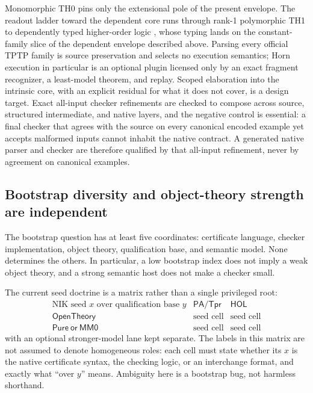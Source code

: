 \documentclass[11pt]{article}
\theoremstyle{definition}
\theoremstyle{remark}
\begin{document}
Monomorphic TH0 pins only the extensional pole of the present envelope.  The
readout ladder toward the dependent core runs through rank-1 polymorphic TH1
\cite{KaliszykSutcliffeRabeTH1} to dependently typed higher-order logic
\cite{RothgangRabeBenzmullerDHOL}, whose typing lands on the constant-family
slice of the dependent envelope described above.  Parsing every official
TPTP family is source preservation and selects no execution semantics; Horn
execution in particular is an optional plugin licensed only by an exact
fragment recognizer, a least-model theorem, and replay.  Scoped elaboration
into the intrinsic core, with an explicit residual for what it does not
cover, is a design target.  Exact all-input checker refinements are checked
to compose across source, structured intermediate, and native layers, and
the negative control is essential: a final checker that agrees with the
source on every canonical encoded example yet accepts malformed inputs
cannot inhabit the native contract.  A generated native parser and checker
are therefore qualified by that all-input refinement, never by agreement on
canonical examples.

\subsection{Bootstrap diversity and object-theory strength are independent}

The bootstrap question has at least five coordinates: certificate language,
checker implementation, object theory, qualification base, and semantic model.
None determines the others.  In particular, a low bootstrap index does not
imply a weak object theory, and a strong semantic host does not make a checker
small.

The current seed doctrine is a matrix rather than a single privileged root:
\[
\begin{array}{c|cc}
  \text{NIK seed }x\text{ over qualification base }y
    & \mathsf{PA/Tpr} & \mathsf{HOL} \\
  \hline
  \mathsf{OpenTheory} & \text{seed cell} & \text{seed cell} \\
  \mathsf{Pure\ or\ MM0} & \text{seed cell} & \text{seed cell}
\end{array}
\]
with an optional stronger-model lane kept separate.  The labels in this matrix
are not assumed to denote homogeneous roles: each cell must state whether its
$x$ is the native certificate syntax, the checking logic, or an interchange
format, and exactly what ``over $y$'' means.  Ambiguity here is a bootstrap bug,
not harmless shorthand.
\end{document}
